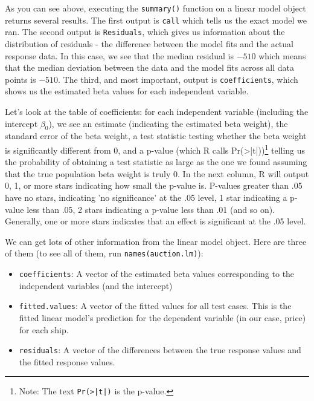 \documentclass{tufte-book}\usepackage[]{graphicx}\usepackage[]{color}
\begin{document}
As you can see above, executing the \texttt{summary()} function on a linear model object returns several results. The first output is \texttt{call} which tells us the exact model we ran. The second output is \texttt{Residuals}, which gives us information about the distribution of residuals - the difference between the model fits and the actual response data. In this case, we see that the median residual is \ensuremath{-510} which means that the median deviation between the data and the model fits across all data points is \ensuremath{-510}. The third, and most important, output is \texttt{coefficients}, which shows us the estimated beta values for each independent variable.

Let's look at the table of coefficients: for each independent variable (including the intercept $\beta_0$), we see an estimate (indicating the estimated beta weight), the standard error of the beta weight, a test statistic testing whether the beta weight is significantly different from 0, and a p-value (which R calls Pr(>|t|))\footnote{Note: The text \texttt{Pr(>|t|)} is the p-value.} telling us the probability of obtaining a test statistic as large as the one we found assuming that the true population beta weight is truly 0. In the next column, R will output 0, 1, or more stars indicating how small the p-value is. P-values greater than .05 have no stars, indicating 'no significance' at the .05 level, 1 star indicating a p-value less than .05, 2 stars indicating a p-value less than .01 (and so on). Generally, one or more stars indicates that an effect is significant at the .05 level.


We can get lots of other information from the linear model object. Here are three of them (to see all of them, run \texttt{names(auction.lm)}):

\begin{itemize}

  \item \texttt{coefficients}: A vector of the estimated beta values corresponding to the independent variables (and the intercept)
  \item \texttt{fitted.values}: A vector of the fitted values for all test cases. This is the fitted linear model's prediction for the dependent variable (in our case, price) for each ship.
  \item \texttt{residuals}: A vector of the differences between the true response values and the fitted response values.

\end{itemize}
\end{document}

